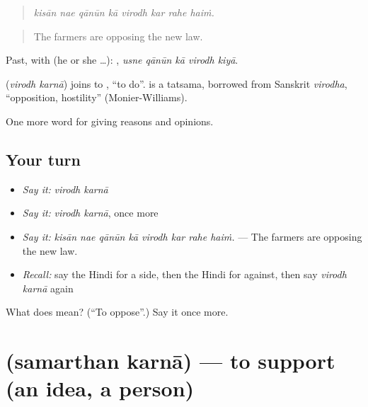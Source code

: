 \begin{quote}
       
\end{quote}

\begin{quote}
\emph{kisān nae qānūn kā virodh kar rahe haiṁ.}
\end{quote}

\begin{quote}
The farmers are opposing the new law.
\end{quote}

Past, with  (he or she …):     , \emph{usne qānūn kā virodh kiyā}.

\begin{cousinweb}
\textbf{ } (\emph{virodh karnā}) joins  to , \textquotedblleft{}to do\textquotedblright{}.  is a tatsama, borrowed from Sanskrit \emph{virodha}, \textquotedblleft{}opposition, hostility\textquotedblright{} (Monier-Williams).
\end{cousinweb}

\begin{grammarlens}[title={What you've built}]
One more word for giving reasons and opinions.
\end{grammarlens}

\subsection*{Your turn}
\begin{itemize}
\raggedright
  \item \emph{Say it:} \emph{virodh karnā}
  \item \emph{Say it:} \emph{virodh karnā}, once more
  \item \emph{Say it:} \emph{kisān nae qānūn kā virodh kar rahe haiṁ.} — The farmers are opposing the new law.
  \item \emph{Recall:} say the Hindi for a side, then the Hindi for against, then say \emph{virodh karnā} again
\end{itemize}

\begin{tcolorbox}[breakable,colback=teal!4,colframe=teal!35!black,title={Before you move on}]
What does   mean? (\textquotedblleft{}To oppose\textquotedblright{}.) Say it once more.
\end{tcolorbox}
\section[\texorpdfstring{\hi{समर्थन} \hi{करना} (samarthan karnā)}{समर्थन करना (samarthan karnā)}]{  (samarthan karnā) — to support (an idea, a person)}

